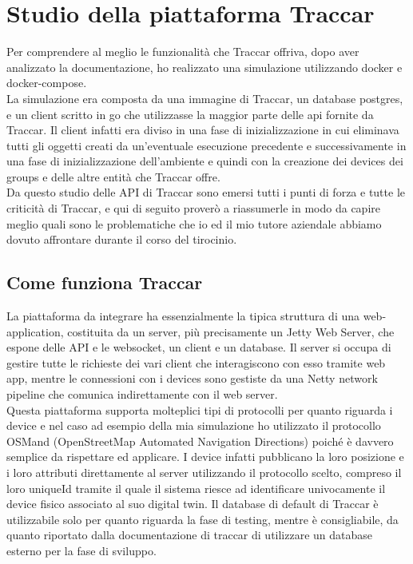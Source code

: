 \documentclass[a4paper,titlepage,12pt]{book}
\begin{document}
{\section{
Studio della piattaforma Traccar}
Per comprendere al meglio le funzionalità che Traccar offriva, dopo aver analizzato la documentazione, ho realizzato una simulazione utilizzando docker e docker-compose.\\
La simulazione era composta da una immagine di Traccar, un database postgres, e un client scritto in go che utilizzasse la maggior parte delle api fornite da Traccar. Il client infatti era diviso in una fase di inizializzazione in cui eliminava tutti gli oggetti creati da un'eventuale esecuzione precedente e successivamente in una fase di inizializzazione dell'ambiente e quindi con la creazione dei devices dei groups e delle altre entità che Traccar offre.\\
Da questo studio delle API di Traccar sono emersi tutti i punti di forza e tutte le criticità di Traccar, e qui di seguito proverò a riassumerle in modo da capire meglio quali sono le problematiche che io ed il mio tutore aziendale abbiamo dovuto affrontare durante il corso del tirocinio.

\subsection{
Come funziona Traccar}
La piattaforma da integrare ha essenzialmente la tipica struttura di una web-application, costituita da un server, più precisamente un Jetty Web Server, che espone delle API e le websocket, un client e un database. Il server si occupa di gestire tutte le richieste dei vari client che interagiscono con esso tramite web app, mentre le connessioni con i devices sono gestiste da una Netty network pipeline che comunica indirettamente con il web server.\\
Questa piattaforma supporta molteplici tipi di protocolli per quanto riguarda i device e nel caso ad esempio della mia simulazione ho utilizzato il protocollo OSMand (OpenStreetMap Automated Navigation Directions) poiché è davvero semplice da rispettare ed applicare. I device infatti pubblicano la loro posizione e i loro attributi direttamente al server utilizzando il protocollo scelto, compreso il loro uniqueId tramite il quale il sistema riesce ad identificare univocamente il device fisico associato al suo digital twin. Il database di default di Traccar è utilizzabile solo per quanto riguarda la fase di testing, mentre è consigliabile, da quanto riportato dalla documentazione di traccar di utilizzare un database esterno per la fase di sviluppo.    
\newpage

}
\end{document}
